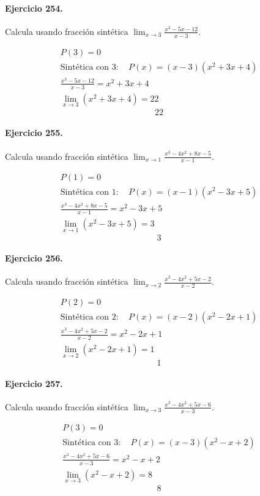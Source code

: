 \documentclass[11pt,a4paper]{article}
\begin{document}
\paragraph{Ejercicio 254.} Calcula usando fracción sintética $\displaystyle\lim_{x\to 3}\frac{x^3 - 5x - 12}{x-3}$. 

\[
\begin{aligned}
P(3)=0\\
\text{Sintética con }3:\quad P(x)=(x-3)(x^2 + 3x + 4)\\
\frac{x^3 - 5x - 12}{x-3}=x^2 + 3x + 4\\
\lim_{x\to 3}(x^2 + 3x + 4)=22
\end{aligned}
\]
\[\boxed{22}\]


\paragraph{Ejercicio 255.} Calcula usando fracción sintética $\displaystyle\lim_{x\to 1}\frac{x^3 - 4x^2 + 8x - 5}{x-1}$. 

\[
\begin{aligned}
P(1)=0\\
\text{Sintética con }1:\quad P(x)=(x-1)(x^2 - 3x + 5)\\
\frac{x^3 - 4x^2 + 8x - 5}{x-1}=x^2 - 3x + 5\\
\lim_{x\to 1}(x^2 - 3x + 5)=3
\end{aligned}
\]
\[\boxed{3}\]


\paragraph{Ejercicio 256.} Calcula usando fracción sintética $\displaystyle\lim_{x\to 2}\frac{x^3 - 4x^2 + 5x - 2}{x-2}$. 

\[
\begin{aligned}
P(2)=0\\
\text{Sintética con }2:\quad P(x)=(x-2)(x^2 - 2x + 1)\\
\frac{x^3 - 4x^2 + 5x - 2}{x-2}=x^2 - 2x + 1\\
\lim_{x\to 2}(x^2 - 2x + 1)=1
\end{aligned}
\]
\[\boxed{1}\]


\paragraph{Ejercicio 257.} Calcula usando fracción sintética $\displaystyle\lim_{x\to 3}\frac{x^3 - 4x^2 + 5x - 6}{x-3}$. 

\[
\begin{aligned}
P(3)=0\\
\text{Sintética con }3:\quad P(x)=(x-3)(x^2 - x + 2)\\
\frac{x^3 - 4x^2 + 5x - 6}{x-3}=x^2 - x + 2\\
\lim_{x\to 3}(x^2 - x + 2)=8
\end{aligned}
\]
\[\boxed{8}\]
\end{document}
